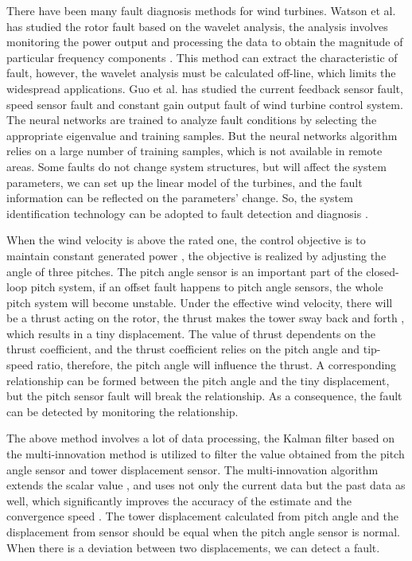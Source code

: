 \documentclass{article}
\begin{document}
There have been many fault diagnosis methods for wind turbines.
Watson et al. has studied the rotor fault based on the wavelet analysis,
the analysis involves monitoring the power output and processing the data to
obtain the magnitude of particular frequency components \cite{ref:4}. This method
can extract the characteristic of fault, however, the wavelet analysis
must be calculated off-line, which limits the widespread applications.
Guo et al. has studied the current feedback sensor fault, speed sensor
fault and constant gain output fault of wind turbine control system\cite{ref:5}.
The neural networks are trained to analyze fault conditions by selecting
the appropriate eigenvalue and training samples. But the neural networks
algorithm relies on a large number of training samples, which is not
available in remote areas. Some faults do not
change system structures, but will affect the system parameters, we can
set up the linear model of the turbines, and the fault information can be
reflected on the parameters' change. So, the system identification
technology can be adopted to fault detection and diagnosis \cite{ref:6}.




When the wind velocity is above the rated one, the control objective
is to maintain constant generated power \cite{ref:7}, the objective is realized by
adjusting the angle of three pitches. The pitch angle sensor is an
important part of the closed-loop pitch system, if an offset fault
happens to pitch angle sensors, the whole pitch system will become
unstable. Under the effective wind velocity, there will be a thrust
acting on the rotor, the thrust makes the tower sway back and forth \cite{ref:8},
which results in a tiny displacement. The value of thrust dependents
on the thrust coefficient, and the thrust coefficient relies on the pitch
angle and tip-speed ratio, therefore, the pitch angle will influence
the thrust. A corresponding relationship can be formed between the
pitch angle and the tiny displacement, but the pitch sensor fault
will break the relationship. As a consequence, the fault can be
detected by monitoring the relationship.

The above method involves a lot of data processing, the
Kalman filter based on the multi-innovation method is utilized to filter the
value obtained from the pitch angle sensor and tower displacement
sensor. The multi-innovation algorithm extends the scalar value \cite{ref:9,ref:10,ref:11},
and uses not only the current data but
the past data as well, which significantly improves the accuracy of the
estimate and the convergence speed \cite{ref:12}. The tower displacement
calculated from pitch angle and the displacement from sensor should
 be equal when the pitch angle sensor is normal. When there is a
 deviation between two displacements, we can detect a fault.
\end{document}
